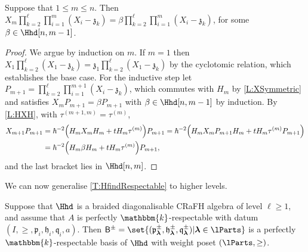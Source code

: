 \documentclass[a4paper,11pt]{amsart}
\newcommand\blam{{\boldsymbol\lambda}}
\numberwithin{equation}{subsection}
\theoremstyle{definition}
\theoremstyle{theorem}
\theoremstyle{remark}
\newcommand\kapp{{\mathfrak{z}}}
\newcommand\plam[1][\lambda]{\mathfrak{p}_{#1}}
\newcommand\hlam[1][\lambda]{\mathfrak{h}_{#1}}
\newcommand\qlam[1][\lambda]{\mathfrak{q}_{#1}}
\newcommand\Basis[1][\pm]{\mathsf{B}^{#1}}
\newcommand\taui[1][i]{\tau^{(#1)}}
\newcommand\kk{\mathbbm{k}}
\begin{document}
\begin{Lemma}\label{L:XXlam}
    Suppose that $1\le m\le n$. Then
    $X_{m}\prod_{k=2}^\ell\prod_{i=1}^m(X_i-\kapp_k)
       =\beta\prod_{k=2}^\ell\prod_{i=1}^m(X_i-\kapp_k)$,
for some $\beta\in\Hhd[n,m-1]$.
\end{Lemma}

\begin{proof}
We argue by induction on $m$. If $m=1$ then
$X_1\prod_{k=2}^\ell(X_1-\kapp_k)=\kapp_1\prod_{k=2}^\ell(X_1-\kapp_k)$ by the cyclotomic relation,
which establishes the base case. For the inductive step let
$P_{m+1}=\prod_{k=2}^\ell\prod_{i=1}^{m+1}(X_i-\kapp_k)$, which commutes with $H_m$ by
\autoref{L:XSymmetric} and satisfies $X_mP_{m+1}=\beta P_{m+1}$ with $\beta\in\Hhd[n,m-1]$ by
induction. By \autoref{L:HXH}, with $\taui[m+1,m]=\taui[m]$,
\begin{align*}
   X_{m+1}P_{m+1}
      &= \hbar^{-2}\Bigl(H_mX_mH_m+t H_m\taui[m]\Bigr)P_{m+1}
       = \hbar^{-2}\Bigl(H_mX_mP_{m+1}H_m+t H_m\taui[m]P_{m+1}\Bigr)\\
      &= \hbar^{-2}\Bigl(H_m\beta H_m+t H_m\taui[m]\Bigr)P_{m+1},
\end{align*}
and the last bracket lies in $\Hhd[n,m]$.
\end{proof}

We can now generalise \autoref{T:HfindRespectable} to higher levels.

\begin{Theorem}\label{T:HhdRespectable}
  Suppose that $\Hhd$ is a braided diagonalisable {CRaFH algebra} of
  level $\ell\ge1$, and assume that $A$ is perfectly $\kk$-respectable with datum
  $(I,\ge,\plam[i],\hlam[i],\qlam[i],a)$. Then
  $\Basis=\set{(\plam[\blam]^\pm, \hlam[\blam]^\pm,\qlam[\blam]^\pm)|\blam\in\lParts}$
  is a perfectly $\kk$-respectable basis of $\Hhd$ with weight poset
  $(\lParts,\ge)$.
\end{Theorem}
\end{document}
